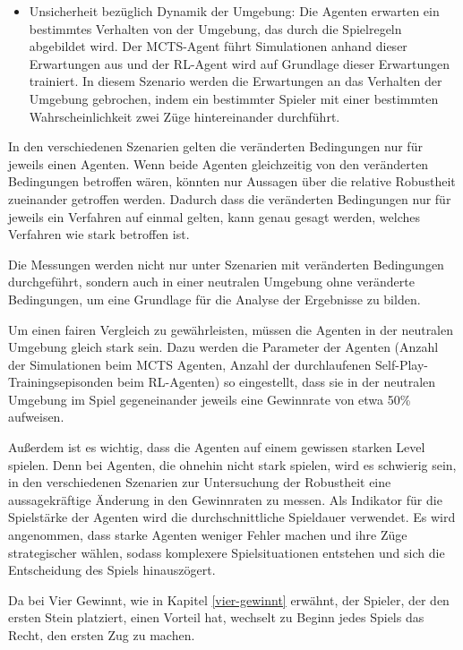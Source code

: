 \begin{itemize}
	\item Unsicherheit bezüglich Dynamik der Umgebung: Die Agenten erwarten ein bestimmtes Verhalten von der Umgebung, das durch die Spielregeln abgebildet wird. Der MCTS-Agent führt Simulationen anhand dieser Erwartungen aus und der RL-Agent wird auf Grundlage dieser Erwartungen trainiert. In diesem Szenario werden die Erwartungen an das Verhalten der Umgebung gebrochen, indem ein bestimmter Spieler mit einer bestimmten Wahrscheinlichkeit zwei Züge hintereinander durchführt.
	
\end{itemize}

In den verschiedenen Szenarien gelten die veränderten Bedingungen nur für jeweils einen Agenten. Wenn beide Agenten gleichzeitig von den veränderten Bedingungen betroffen wären, könnten nur Aussagen über die relative Robustheit zueinander getroffen werden. Dadurch dass die veränderten Bedingungen nur für jeweils ein Verfahren auf einmal gelten, kann genau gesagt werden, welches Verfahren wie stark betroffen ist.

Die Messungen werden nicht nur unter Szenarien mit veränderten Bedingungen durchgeführt, sondern auch in einer neutralen Umgebung ohne veränderte Bedingungen, um eine Grundlage für die Analyse der Ergebnisse zu bilden.

Um einen fairen Vergleich zu gewährleisten, müssen die Agenten in der neutralen Umgebung gleich stark sein. Dazu werden die Parameter der Agenten (Anzahl der Simulationen beim MCTS Agenten, Anzahl der durchlaufenen Self-Play-Trainingsepisonden beim RL-Agenten) so eingestellt, dass sie in der neutralen Umgebung im Spiel gegeneinander jeweils eine Gewinnrate von etwa 50\% aufweisen.

Außerdem ist es wichtig, dass die Agenten auf einem gewissen starken Level spielen. Denn bei Agenten, die ohnehin nicht stark spielen, wird es schwierig sein, in den verschiedenen Szenarien zur Untersuchung der Robustheit eine aussagekräftige Änderung in den Gewinnraten zu messen. Als Indikator für die Spielstärke der Agenten wird die durchschnittliche Spieldauer verwendet. Es wird angenommen, dass starke Agenten weniger Fehler machen und ihre Züge strategischer wählen, sodass komplexere Spielsituationen entstehen und sich die Entscheidung des Spiels hinauszögert.

Da bei Vier Gewinnt, wie in Kapitel \ref{vier-gewinnt} erwähnt, der Spieler, der den ersten Stein platziert, einen Vorteil hat, wechselt zu Beginn jedes Spiels das Recht, den ersten Zug zu machen.
